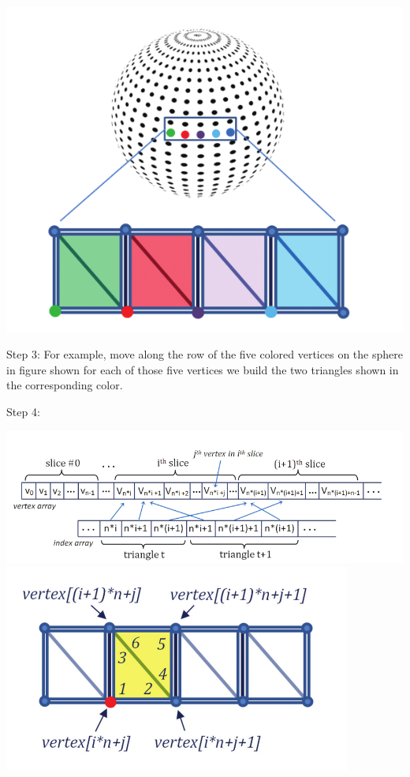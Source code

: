 \documentclass[12pt]{article}
\begin{document}
\begin{enumerate}
	\begin{center}
	\includegraphics[scale = 0.5]{sphere/2.png}
	\end{center}
		
	Step 3: For example, move along the row of the five colored vertices on the sphere in figure shown for each of those five vertices we build the two triangles shown in the corresponding color.
				
	Step 4: 
	
	\begin{center}
	\includegraphics[scale = 0.3]{sphere/5.png}
	\includegraphics[scale = 0.3]{sphere/6.png}
	\end{center}
	

\end{enumerate}
\end{document}
